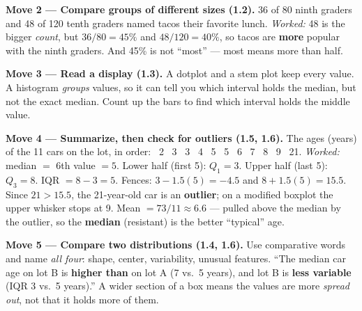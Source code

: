 \documentclass[12pt]{article}
\begin{document}
\vspace{3pt}
\textbf{Move 2 --- Compare groups of different sizes (1.2).} 36 of 80 ninth graders and 48 of
120 tenth graders named tacos their favorite lunch. \emph{Worked:} 48 is the bigger
\emph{count}, but $36/80 = 45\%$ and $48/120 = 40\%$, so tacos are \textbf{more} popular with the
ninth graders. And 45\% is not ``most'' --- most means more than half.

\vspace{3pt}
\textbf{Move 3 --- Read a display (1.3).} A dotplot and a stem plot keep every value. A histogram
\emph{groups} values, so it can tell you which interval holds the median, but not the exact
median. Count up the bars to find which interval holds the middle value.

\vspace{3pt}
\textbf{Move 4 --- Summarize, then check for outliers (1.5, 1.6).} The ages (years) of the 11 cars
on the lot, in order: \ 2 \ 3 \ 3 \ 4 \ 5 \ 5 \ 6 \ 7 \ 8 \ 9 \ 21.
\emph{Worked:} median $=$ 6th value $= 5$. Lower half (first 5): $Q_1 = 3$. Upper half (last 5):
$Q_3 = 8$. IQR $= 8 - 3 = 5$. Fences: $3 - 1.5(5) = -4.5$ and $8 + 1.5(5) = 15.5$. Since
$21 > 15.5$, the 21-year-old car is an \textbf{outlier}; on a modified boxplot the upper whisker
stops at 9. Mean $= 73/11 \approx 6.6$ --- pulled above the median by the outlier, so the
\textbf{median} (resistant) is the better ``typical'' age.

\vspace{4pt}
{\centering
{}\par}

\vspace{3pt}
\textbf{Move 5 --- Compare two distributions (1.4, 1.6).} Use comparative words and name
\emph{all four}: shape, center, variability, unusual features. ``The median car age on lot B is
\textbf{higher than} on lot A (7 vs.\ 5 years), and lot B is \textbf{less variable} (IQR 3 vs.\
5 years).'' A wider section of a box means the values are more \emph{spread out}, not that it holds
more of them.
\end{document}

